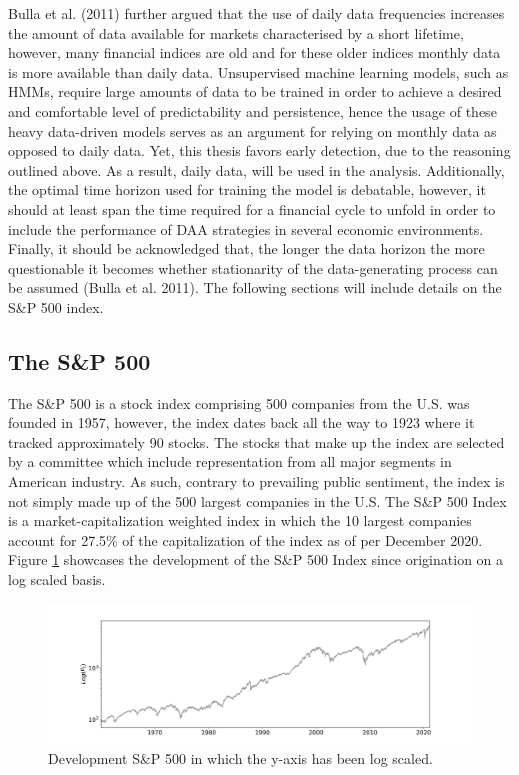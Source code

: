 Bulla et al. (2011) further argued that the use of daily data frequencies increases the amount of data available for markets characterised by a short lifetime, however, many financial indices are old and for these older indices monthly data is more available than daily data. Unsupervised machine learning models, such as HMMs, require large amounts of data to be trained in order to achieve a desired and comfortable level of predictability and persistence, hence the usage of these heavy data-driven models serves as an argument for relying on monthly data as opposed to daily data. Yet, this thesis favors early detection, due to the reasoning outlined above. As a result, daily data, will be used in the analysis. Additionally, the optimal time horizon used for training the model is debatable, however, it should at least span the time required for a financial cycle to unfold in order to include the performance of DAA strategies in several economic environments. Finally, it should be acknowledged that, the longer the data horizon the more questionable it becomes whether stationarity of the data-generating process can be assumed (Bulla et al. 2011). The following sections will include details on the S\&P 500 index.
 
\subsection{The S\&P 500}
The S\&P 500 is a stock index comprising 500 companies from the U.S. was founded in 1957, however, the index dates back all the way to 1923 where it tracked approximately 90 stocks. The stocks that make up the index are selected by a committee which include representation from all major segments in American industry. As such, contrary to prevailing public sentiment, the index is not simply made up of the 500 largest companies in the U.S. The S\&P 500 Index is a market-capitalization weighted index in which the 10 largest companies account for 27.5\% of the capitalization of the index as of per December 2020. Figure \ref{fig: SP500_index} showcases the development of the S\&P 500 Index since origination on a log scaled basis. 
 
\begin{figure}[H] 
    \centering
    \includegraphics[width=1\textwidth]{analysis/data_description/images/SP500_index.png}
    \caption{Development S\&P 500 in which the y-axis has been log scaled.}
    \label{fig: SP500_index}
\end{figure}

